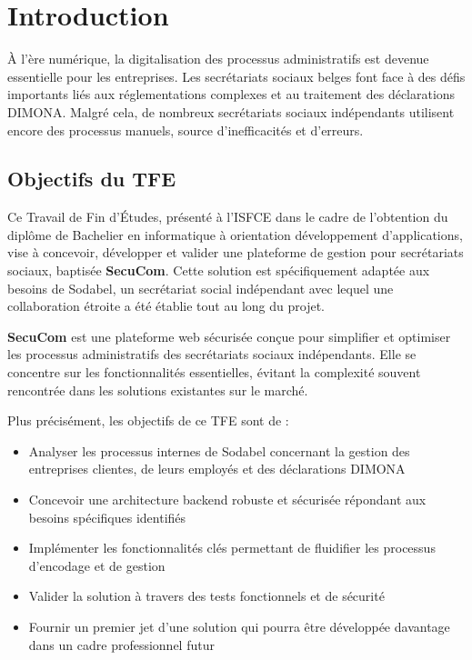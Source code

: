 \chapter*{Introduction}

À l'ère numérique, la digitalisation des processus administratifs est devenue essentielle pour les entreprises. Les secrétariats sociaux belges font face à des défis importants liés aux réglementations complexes et au traitement des déclarations DIMONA. Malgré cela, de nombreux secrétariats sociaux indépendants utilisent encore des processus manuels, source d'inefficacités et d'erreurs.

\section*{Objectifs du TFE}

Ce Travail de Fin d'Études, présenté à l'ISFCE dans le cadre de l'obtention du diplôme de Bachelier en informatique à orientation développement d'applications, vise à concevoir, développer et valider une plateforme de gestion pour secrétariats sociaux, baptisée \textbf{SecuCom}. Cette solution est spécifiquement adaptée aux besoins de Sodabel, un secrétariat social indépendant avec lequel une collaboration étroite a été établie tout au long du projet.

\vspace{0.5cm}

\begin{tcolorbox}[
  title={\textbf{SecuCom}},
  colback=blue!5!white,
  colframe=primarycolor,
  fonttitle=\bfseries,
  boxrule=0.5mm,
  arc=2mm,
  left=6mm,
  right=6mm,
  top=6mm,
  bottom=6mm
]\textbf{SecuCom} est une plateforme web sécurisée conçue pour simplifier et optimiser les processus administratifs des secrétariats sociaux indépendants. Elle se concentre sur les fonctionnalités essentielles, évitant la complexité souvent rencontrée dans les solutions existantes sur le marché.
\end{tcolorbox}

\vspace{0.5cm}


\noindent Plus précisément, les objectifs de ce TFE sont de :
\begin{itemize}[leftmargin=*,label=\textcolor{darkgray}{$\bullet$},itemsep=0.3em]
  \item Analyser les processus internes de Sodabel concernant la gestion des entreprises clientes, de leurs employés et des déclarations DIMONA
  \item Concevoir une architecture backend robuste et sécurisée répondant aux besoins spécifiques identifiés
  \item Implémenter les fonctionnalités clés permettant de fluidifier les processus d'encodage et de gestion
  \item Valider la solution à travers des tests fonctionnels et de sécurité
  \item Fournir un premier jet d'une solution qui pourra être développée davantage dans un cadre professionnel futur
\end{itemize}

